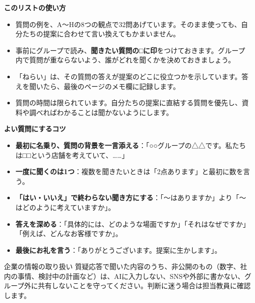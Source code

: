 \begin{tcolorbox}[enhanced,colback=phasetint,colframe=phasetint,arc=1.5mm,boxrule=0pt,
    left=3mm,right=3mm,top=1.5mm,bottom=1.5mm,fontupper=\small]
  {\sffamily\bfseries\color{phase}このリストの使い方}\par
  \begin{itemize}[label=\textcolor{phase}{・},leftmargin=1.2em]
    \item 質問の例を、A〜Hの8つの観点で32問あげています。そのまま使っても、自分たちの提案に合わせて言い換えてもかまいません。
    \item 事前にグループで読み、\textbf{聞きたい質問の□に印}をつけておきます。グループ内で質問が重ならないよう、誰がどれを聞くかを決めておきましょう。
    \item 「ねらい」は、その質問の答えが提案のどこに役立つかを示しています。答えを聞いたら、最後のページのメモ欄に記録します。
    \item 質問の時間は限られています。自分たちの提案に直結する質問を優先し、資料や調べればわかることは聞かないようにします。
  \end{itemize}
\end{tcolorbox}

\begin{tcolorbox}[enhanced,colback=white,colframe=rulegray,boxrule=0.5pt,arc=1.5mm,
    left=3mm,right=3mm,top=1.5mm,bottom=1.5mm,fontupper=\small]
  {\sffamily\bfseries\color{phase}よい質問にするコツ}\par
  \begin{itemize}[label=\textcolor{phase}{・},leftmargin=1.2em]
    \item \textbf{最初に名乗り、質問の背景を一言添える}：「○○グループの△△です。私たちは□□という店舗を考えていて、……」
    \item \textbf{一度に聞くのは1つ}：複数を聞きたいときは「2点あります」と最初に数を言う。
    \item \textbf{「はい・いいえ」で終わらない聞き方にする}：「〜はありますか」より「〜はどのように考えていますか」。
    \item \textbf{答えを深める}：「具体的には、どのような場面ですか」「それはなぜですか」「例えば、どんなお客様ですか」。
    \item \textbf{最後にお礼を言う}：「ありがとうございます。提案に生かします」。
  \end{itemize}
\end{tcolorbox}

\begin{caution}{企業の情報の取り扱い}
  質疑応答で聞いた内容のうち、非公開のもの（数字、社内の事情、検討中の計画など）は、AIに入力しない、SNSや外部に書かない、グループ外に共有しないことを守ってください。判断に迷う場合は担当教員に確認します。
\end{caution}

